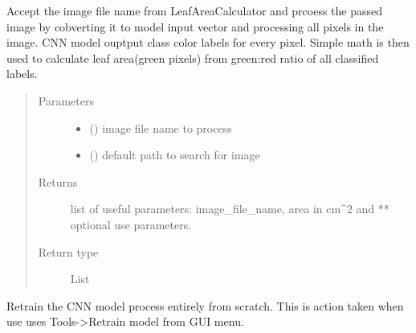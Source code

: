 \documentclass[letterpaper,10pt,english]{sphinxmanual}
\begin{document}

\begin{fulllineitems}
\label{\detokenize{pyleaf.basefunctions:pyleaf.basefunctions.PROCESS_IMAGE}}
Accept the image file name from LeafAreaCalculator and prcoess the passed image by cobverting it to model input vector and processing all pixels in the image.
CNN model ouptput class color labels for every pixel. Simple math is then used to calculate leaf area(green pixels) from green:red ratio of all classified labels.
\begin{quote}\begin{description}
\item[{Parameters}] \leavevmode\begin{itemize}
\item {} 
 () \textendash{} image file name to process

\item {} 
 () \textendash{} default path to search for image

\end{itemize}

\item[{Returns}] \leavevmode
list of useful parameters: image\_file\_name, area in cm\textasciicircum{}2 and ** optional use parameters.

\item[{Return type}] \leavevmode
List

\end{description}\end{quote}

\end{fulllineitems}


\begin{fulllineitems}
\label{\detokenize{pyleaf.basefunctions:pyleaf.basefunctions.RETRAIN_MODEL_FROM_SCRATCH}}
Retrain the CNN model process entirely from scratch. This is action taken when use uses Tools-\textgreater{}Retrain model from GUI menu.

\end{fulllineitems}
\end{document}
